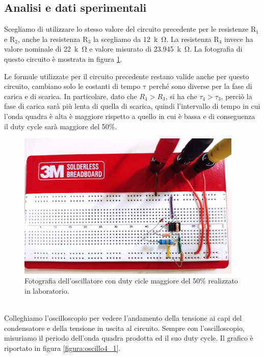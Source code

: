 \documentclass{report}
\begin{document}
\subsection{Analisi e dati sperimentali}
Scegliamo di utilizzare lo stesso valore del circuito precedente per le resistenze $\mathrm{R_1}$ e $\mathrm{R_2}$, anche la resistenza $\mathrm{R_3}$ la scegliamo da \SI{12}{k\ohm}. La resistenza $\mathrm{R_4}$ invece ha valore nominale di \SI{22}{k\ohm} e valore misurato di \SI{23.945}{k\ohm}. La fotografia di questo circuito è mostrata in figura \ref{figura:circuito4_1}.\par
Le formule utilizzate per il circuito precedente restano valide anche per questo circuito, cambiano solo le costanti di tempo $\mathrm{\tau}$ perché sono diverse per la fase di carica e di scarica. In particolare, dato che $\displaystyle{R_4>R_3}$, si ha che $\displaystyle{\tau_4>\tau_3}$, perciò la fase di carica sarà più lenta di quella di scarica, quindi l'intervallo di tempo in cui l'onda quadra è alta è maggiore rispetto a quello in cui è bassa e di conseguenza il duty cycle sarà maggiore del 50\%.
\begin{figure}[h!]
	\centering
	\includegraphics[height=7cm]{immagini/circuito4_1.jpg}
	\caption{Fotografia dell'oscillatore con duty cicle maggiore del 50\% realizzato in laboratorio.}
	\label{figura:circuito4_1}
\end{figure}
\\Colleghiamo l'oscilloscopio per vedere l'andamento della tensione ai capi del condensatore e della tensione in uscita al circuito. Sempre con l'oscilloscopio, misuriamo il periodo dell'onda quadra prodotta ed il suo duty cycle. Il grafico è riportato in figura \ref{figura:oscillo4_1}.\par
\end{document}
